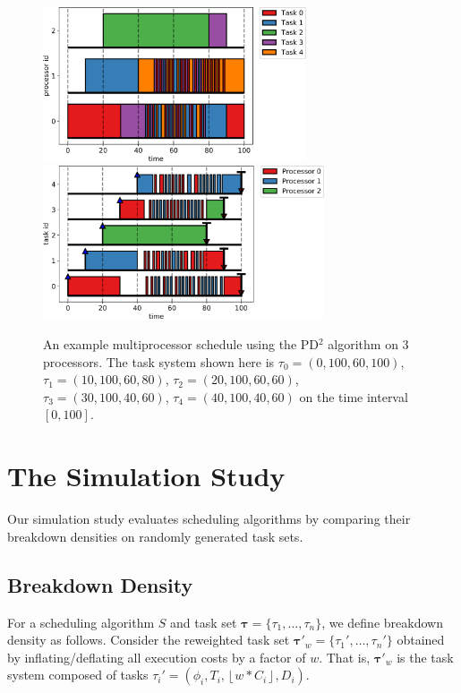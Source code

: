 \documentclass[11pt]{article}
\begin{document}
\begin{figure}
	\centering
	\phantom{spacing}
	\includegraphics[height=4.55cm]{Pfair_multiprocessor_example1_combined.png}\quad
	\includegraphics[height=4.55cm]{Pfair_multiprocessor_example2_combined.png}
	\caption{An example multiprocessor schedule using the PD$^2$ algorithm on 3 processors. The task system shown here is $\tau_0 = (0,100,60,100)$, $\tau_1 = (10,100,60,80)$, $\tau_2=(20,100,60,60)$, $\tau_3=(30,100,40,60)$, $\tau_4=(40,100,40,60)$ on the time interval $[0, 100]$.}
	\label{fig:Pfair_multiprocessor_plot}
\end{figure}

\section{The Simulation Study}
\label{sec:SimulationStudy}

Our simulation study evaluates scheduling algorithms by comparing their breakdown densities on randomly generated task sets.

\subsection{Breakdown Density}\label{sec:BreakdownDensity}

For a scheduling algorithm $S$ and task set $\bm{\tau} = \{\tau_1, \dots, \tau_n\}$, we define breakdown density as follows. Consider the reweighted task set $\bm{\tau}'_w = \{\tau_1', \dots, \tau_n'\}$ obtained by inflating/deflating all execution costs by a factor of $w$. That is, $\bm{\tau}'_w$ is the task system composed of tasks $\tau_i' = (\phi_i, T_i, \left\lfloor w*C_i \right\rfloor, D_i)$.
\end{document}
